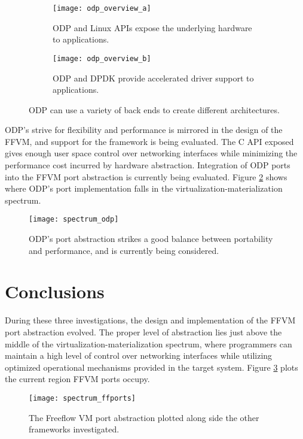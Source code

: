 \begin{figure}[h!]
  \centering
  \begin{subfigure}[b]{0.48\textwidth}
    \centering
    \texttt{[image: odp\_overview\_a]}
    \caption{ODP and Linux APIs expose the underlying hardware to applications.}
  \end{subfigure}
  \hfill
  \begin{subfigure}[b]{0.48\textwidth}
    \centering
    \texttt{[image: odp\_overview\_b]}
    \caption{ODP and DPDK provide accelerated driver support to applications.}
  \end{subfigure}
  \caption{ODP can use a variety of back ends to create different architectures.}
  \label{hardware:odp_overview}
\end{figure}

ODP's strive for flexibility and performance is mirrored in the design of the
FFVM, and support for the framework is being evaluated. The C API exposed gives
enough user space control over networking interfaces while minimizing the
performance cost incurred by hardware abstraction. Integration of ODP ports
into the FFVM port abstraction is currently being evaluated. Figure
\ref{hardware:spectrum_odp} shows where ODP's port implementation falls in the
virtualization-materialization spectrum.

\begin{figure}[h!]
  \centering
  \texttt{[image: spectrum\_odp]}
  \caption{ODP's port abstraction strikes a good balance between portability
  and performance, and is currently being considered.}
  \label{hardware:spectrum_odp}
\end{figure}

\section{Conclusions}
\label{hardware:concl}
During these three investigations, the design and implementation of the FFVM
port abstraction evolved. The proper level of abstraction lies just above the
middle of the virtualization-materialization spectrum, where programmers can
maintain a high level of control over networking interfaces while utilizing
optimized operational mechanisms provided in the target system. Figure
\ref{hardware:spectrum_ffports} plots the current region FFVM ports occupy.

\begin{figure}[h!]
  \centering
  \texttt{[image: spectrum\_ffports]}
  \caption{The Freeflow VM port abstraction plotted along side the other
  frameworks investigated.}
  \label{hardware:spectrum_ffports}
\end{figure}
